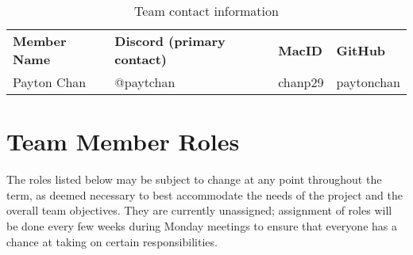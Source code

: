 \documentclass{article}
\begin{document}
\begin{table}[h!]
\centering
\begin{tabular}{|l|l|l|l|}
\hline
\textbf{Member Name} & \textbf{Discord (primary contact)} & \textbf{MacID} &
\textbf{GitHub} \\ 
 Payton Chan   & @paytchan    & chanp29  & paytonchan \\ 
\end{tabular}
\caption{Team contact information}
\end{table}

\newpage

\section{Team Member Roles}
The roles listed below may be subject to change at any point throughout the
term, as deemed necessary to best accommodate the needs of the project and the
overall team objectives. They are currently unassigned; assignment of roles will
be done every few weeks during Monday meetings to ensure that everyone has a
chance at taking on certain responsibilities.
\end{document}
